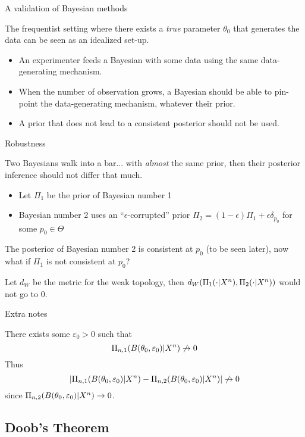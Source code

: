 {A validation of Bayesian methods}

The frequentist setting where there exists a \emph{true} parameter $\theta_0$ that generates the data can be seen as an idealized set-up. 
\begin{itemize}
	\item An experimenter feeds a Bayesian with some data using the same data-generating mechanism. 
	\item When the number of observation grows, a Bayesian should be able to pin-point the data-generating mechanism, whatever their prior. 
	\item<2> \alert{A prior that does not lead to a consistent posterior should not be used.} 
\end{itemize}







{Robustness}

Two Bayesians walk into a bar... with \emph{almost} the same prior, then their posterior inference should not differ that much.  
\begin{itemize}
\item Let $\Pi_1$ be the prior of Bayesian number 1
\item Bayesian number 2 uses an ``$\epsilon$-corrupted'' prior $\Pi_2 = (1-\epsilon)\Pi_1 + \epsilon \delta_{p_0}$ for some $p_0 \in \Theta$
\end{itemize}
The posterior of Bayesian number 2 is consistent at $p_0$ (to be seen later), now what if $\Pi_1$ is not consistent at $p_0$? 
 
Let $d_W$ be the metric for the weak topology, then $d_W(\Pi_1(\cdot|X^n), \Pi_2(\cdot|X^n))$ would not go to $0$. 










{Extra notes}

There exists some $\varepsilon_0 >0$ such that 
$$
\Pi_{n,1}(B(\theta_0,\varepsilon_0)|X^n) \not\to 0 
$$
Thus 
$$
|\Pi_{n,1}(B(\theta_0,\varepsilon_0)|X^n) - \Pi_{n,2}(B(\theta_0,\varepsilon_0)|X^n) | \not\to 0
$$
since $\Pi_{n,2}(B(\theta_0,\varepsilon_0)|X^n) \to 0$.




\subsection{Doob's Theorem}




